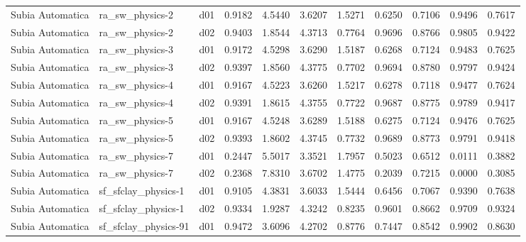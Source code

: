 \begin{longtable}{lllrrrrrrrr}
     Subia Automatica  &       ra\_sw\_physics-2 &     d01 &   0.9182 &   4.5440 &   3.6207 &       1.5271 &        0.6250 &       0.7106 &           0.9496 &  0.7617 \\
     Subia Automatica  &       ra\_sw\_physics-2 &     d02 &   0.9403 &   1.8544 &   4.3713 &       0.7764 &        0.9696 &       0.8766 &           0.9805 &  0.9422 \\
     Subia Automatica  &       ra\_sw\_physics-3 &     d01 &   0.9172 &   4.5298 &   3.6290 &       1.5187 &        0.6268 &       0.7124 &           0.9483 &  0.7625 \\
     Subia Automatica  &       ra\_sw\_physics-3 &     d02 &   0.9397 &   1.8560 &   4.3775 &       0.7702 &        0.9694 &       0.8780 &           0.9797 &  0.9424 \\
     Subia Automatica  &       ra\_sw\_physics-4 &     d01 &   0.9167 &   4.5223 &   3.6260 &       1.5217 &        0.6278 &       0.7118 &           0.9477 &  0.7624 \\
     Subia Automatica  &       ra\_sw\_physics-4 &     d02 &   0.9391 &   1.8615 &   4.3755 &       0.7722 &        0.9687 &       0.8775 &           0.9789 &  0.9417 \\
     Subia Automatica  &       ra\_sw\_physics-5 &     d01 &   0.9167 &   4.5248 &   3.6289 &       1.5188 &        0.6275 &       0.7124 &           0.9476 &  0.7625 \\
     Subia Automatica  &       ra\_sw\_physics-5 &     d02 &   0.9393 &   1.8602 &   4.3745 &       0.7732 &        0.9689 &       0.8773 &           0.9791 &  0.9418 \\
     Subia Automatica  &       ra\_sw\_physics-7 &     d01 &   0.2447 &   5.5017 &   3.3521 &       1.7957 &        0.5023 &       0.6512 &           0.0111 &  0.3882 \\
     Subia Automatica  &       ra\_sw\_physics-7 &     d02 &   0.2368 &   7.8310 &   3.6702 &       1.4775 &        0.2039 &       0.7215 &           0.0000 &  0.3085 \\
     Subia Automatica  &   sf\_sfclay\_physics-1 &     d01 &   0.9105 &   4.3831 &   3.6033 &       1.5444 &        0.6456 &       0.7067 &           0.9390 &  0.7638 \\
     Subia Automatica  &   sf\_sfclay\_physics-1 &     d02 &   0.9334 &   1.9287 &   4.3242 &       0.8235 &        0.9601 &       0.8662 &           0.9709 &  0.9324 \\
     Subia Automatica  &  sf\_sfclay\_physics-91 &     d01 &   0.9472 &   3.6096 &   4.2702 &       0.8776 &        0.7447 &       0.8542 &           0.9902 &  0.8630 \\

\end{longtable}
